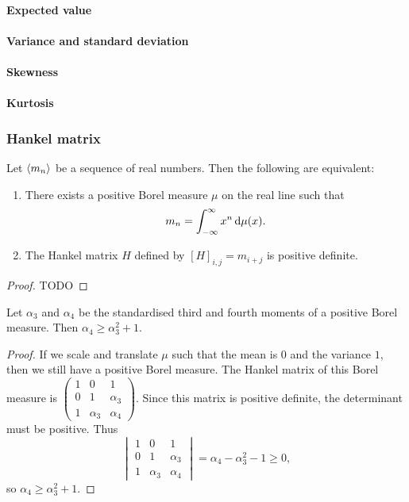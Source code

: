 \paragraph{Expected value}
\paragraph{Variance and standard deviation}
\paragraph{Skewness}
\paragraph{Kurtosis}

\subsubsection{Hankel matrix}
\begin{proposition}
Let $\left\langle m_n \right\rangle$ be a sequence of real numbers. Then the following are equivalent:
\begin{enumerate}
\item There exists a positive Borel measure $\mu$ on the real line such that
\[ m_n = \int_{-\infty}^\infty x^n\operatorname{d \!}{\mu(x)}. \]
\item The Hankel matrix $H$ defined by $[H]_{i,j} = m_{i+j}$ is positive definite.
\end{enumerate}
\end{proposition}
\begin{proof}
TODO
\end{proof}
\begin{corollary}
Let $\alpha_3$ and $\alpha_4$ be the standardised third and fourth moments of a positive Borel measure. Then $\alpha_4 \geq \alpha_3^2 +1$.
\end{corollary}
\begin{proof}
If we scale and translate $\mu$ such that the mean is $0$ and the variance $1$, then we still have a positive Borel measure. The Hankel matrix of this Borel measure is $\begin{pmatrix}
1 & 0 & 1 \\
0 & 1 & \alpha_3 \\
1 & \alpha_3 & \alpha_4
\end{pmatrix}$. Since this matrix is positive definite, the determinant must be positive. Thus
\[ \begin{vmatrix}
1 & 0 & 1 \\
0 & 1 & \alpha_3 \\
1 & \alpha_3 & \alpha_4
\end{vmatrix} = \alpha_4 - \alpha_3^2 - 1 \geq 0, \]
so $\alpha_4 \geq \alpha_3^2 +1$.
\end{proof}

